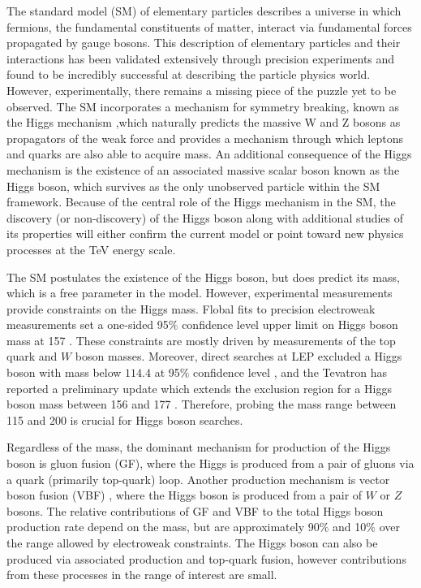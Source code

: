 The standard model (SM) of elementary particles describes a universe in which fermions, the fundamental 
constituents of  matter, interact via fundamental forces propagated by gauge bosons. This description of elementary
particles and their interactions has been validated extensively through precision experiments and found to be incredibly
successful at describing the particle physics world. However, experimentally, there remains a missing piece of the
puzzle yet to be observed.  The SM incorporates a mechanism for symmetry breaking, known as the Higgs mechanism 
\cite{ref:HiggsMechanism,ref:HiggsMechanism1},which naturally predicts the massive W and Z bosons as propagators of the weak 
force and provides a mechanism through which leptons and quarks are also able to acquire mass. An additional consequence of 
the Higgs mechanism is the existence of an associated massive scalar boson known as the Higgs boson, which survives as the only unobserved particle within
the SM framework.  Because of the central role of the Higgs mechanism in the SM, the discovery (or non-discovery) of the
Higgs boson along with additional studies of its properties will either confirm the current model or point toward new physics 
processes at the TeV energy scale.

The SM postulates the existence of the Higgs boson, but does predict its mass, which is a free parameter in the model. 
However, experimental measurements provide constraints on the Higgs mass.  Flobal fits to precision electroweak measurements 
set a one-sided 95$\%$ confidence level upper limit on Higgs boson mass at 157 \GeVcc \cite{ref:GlobalEwkConstraints}.
These constraints are mostly driven by measurements of the top quark and $W$ boson masses. Moreover, direct searches
at LEP excluded a Higgs boson with mass below $114.4$ \GeVcc at 95$\%$ confidence level \cite{ref:LepExclusion}, and the Tevatron
has reported a preliminary update which extends the exclusion region for a Higgs boson mass between 156 and 177 \GeVcc \cite{ref:TevExclusion}.
Therefore, probing the mass range between 115 and 200 \GeVcc is crucial for Higgs boson searches.

Regardless of the mass, the dominant mechanism for production of the Higgs boson is gluon fusion (GF)\cite{ref:GF1,ref:GF2}, where the Higgs
is produced from a pair of gluons via a quark (primarily top-quark) loop. Another production mechanism is vector boson 
fusion (VBF) \cite{ref:VBF}, where the Higgs boson is produced from a pair of $W$ or $Z$ bosons. The relative contributions of GF and VBF
to the total Higgs boson production rate depend on the mass, but are approximately 90$\%$ and 10$\%$ over the range allowed
by electroweak constraints.  The Higgs boson can also be produced via associated production \cite{ref:VH1,ref:VH2} and top-quark fusion, however
contributions from these processes in the range of interest are small.

